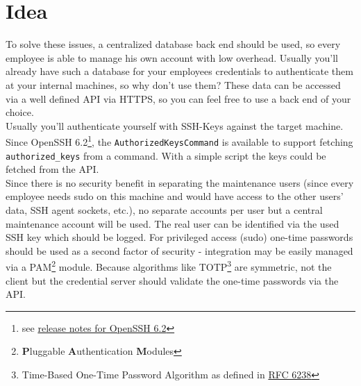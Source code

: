 %
%
%
%
%
%
%


\section{Idea}

To solve these issues, a centralized database back end should be used, so every
employee is able to manage his own account with low overhead. Usually you'll
already have such a database for your employees credentials to authenticate them
at your internal machines, so why don't use them? These data can be accessed via
a well defined API via HTTPS, so you can feel free to use a back end of your
choice. \\

Usually you'll authenticate yourself with SSH-Keys against the target machine.
Since OpenSSH 6.2\footnote{see
\href{http://www.openssh.com/txt/release-6.2}{release notes for OpenSSH 6.2}},
the \verb+AuthorizedKeysCommand+ is available to support fetching
\verb+authorized_keys+ from a command. With a simple script the keys could be
fetched from the API. \\

Since there is no security benefit in separating the
maintenance users (since every employee needs sudo on this machine and would
have access to the other users' data, SSH agent sockets, etc.), no separate
accounts per user but a central maintenance account will be used. The real user
can be identified via the used SSH key which should be logged. For privileged
access (sudo) one-time passwords should be used as a second factor of security -
integration may be easily managed via a PAM\footnote{\textbf{P}luggable
\textbf{A}uthentication \textbf{M}odules} module. Because algorithms like
TOTP\footnote{Time-Based One-Time Password Algorithm as defined in
\href{https://tools.ietf.org/html/rfc6238}{RFC 6238}} are symmetric, not the
client but the credential server should validate the one-time passwords via the
API. \\

